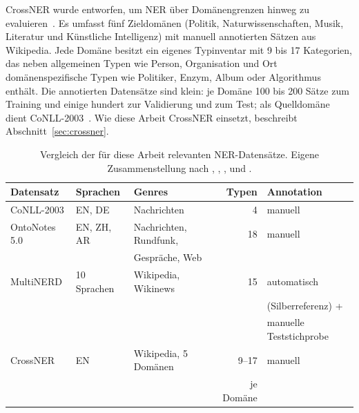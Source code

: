 CrossNER wurde entworfen, um NER über Domänengrenzen hinweg zu
evaluieren~\cite{liu2021crossner}.
Es umfasst fünf Zieldomänen (Politik, Naturwissenschaften, Musik,
Literatur und Künstliche Intelligenz) mit manuell annotierten Sätzen aus
Wikipedia.
Jede Domäne besitzt ein eigenes Typinventar mit 9 bis 17 Kategorien,
das neben allgemeinen Typen wie Person, Organisation und Ort
domänenspezifische Typen wie Politiker, Enzym, Album oder Algorithmus
enthält.
Die annotierten Datensätze sind klein: je Domäne 100 bis 200 Sätze zum
Training und einige hundert zur Validierung und zum Test; als
Quelldomäne dient CoNLL-2003~\cite{liu2021crossner}.
Wie diese Arbeit CrossNER einsetzt, beschreibt
Abschnitt~\ref{sec:crossner}.

\begin{table}[htbp]
  \centering
  \small
  \renewcommand{\arraystretch}{1.25}
  \caption[Vergleich der für diese Arbeit relevanten NER-Datensätze]{Vergleich der für diese Arbeit relevanten NER-Datensätze.
  Eigene Zusammenstellung nach \textcite{sang2003conll},
  \textcite{weischedel2013ontonotes}, \textcite{li2018survey},
  \textcite{tedeschi2022multinerd} und \textcite{liu2021crossner}.}
  \label{tab:datasets-vergleich}
  \setlength{\tabcolsep}{4pt}
  \begin{tabular}{lllrl}
    \toprule
    \textbf{Datensatz} & \textbf{Sprachen} & \textbf{Genres}
      & \textbf{Typen} & \textbf{Annotation} \\
    \midrule
    CoNLL-2003    & EN, DE          & Nachrichten             &  4
      & manuell \\
    OntoNotes 5.0 & EN, ZH, AR      & Nachrichten, Rundfunk,  & 18
      & manuell \\
                  &                 & Gespräche, Web          &
      & \\
    MultiNERD     & 10 Sprachen     & Wikipedia, Wikinews     & 15
      & automatisch \\
                  &                 &                         &
      & (Silberreferenz) + \\
                  &                 &                         &
      & manuelle Teststichprobe \\
    CrossNER      & EN              & Wikipedia, 5 Domänen    & 9--17
      & manuell \\
                  &                 &                         & je Domäne
      & \\
    \bottomrule
  \end{tabular}
\end{table}

